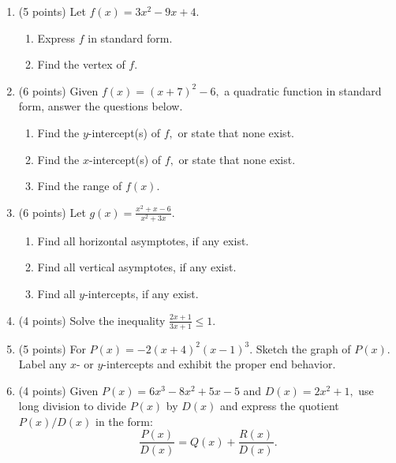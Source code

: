 \documentclass[11pt]{article}
\begin{document}
\begin{enumerate}
\item (5 points) Let $f(x)=3x^2-9x+4.$
\begin{enumerate}
\item Express $f$ in standard form.
\vspace{1.5in}
\item Find the vertex of $f.$
\vspace{0.5in}
\end{enumerate}
\item (6 points) Given $f(x)=(x+7)^2-6,$ a quadratic function in standard form, answer the questions below.
\begin{enumerate}
\item Find the $y$-intercept(s) of $f,$ or state that none exist.
\vfill
\item Find the $x$-intercept(s) of $f,$ or state that none exist.
\vfill
\item Find the range of $f(x).$
\vfill
\end{enumerate}
\newpage

\item (6 points) Let $g(x)=\frac{x^2+x-6}{x^2+3x}.$
\begin{enumerate}
\item Find all horizontal asymptotes, if any exist.
\vfill
\item Find all vertical asymptotes, if any exist.
\vfill
\item Find all $y$-intercepts, if any exist.
\vfill
\end{enumerate}
\item (4 points) Solve the inequality $\frac{2x+1}{3x+1}\leq 1.$
\vspace{3in}
\newpage
\item (5 points) For $P(x)=-2(x+4)^2(x-1)^3.$ Sketch the graph of $P(x).$ Label any $x$- or $y$-intercepts and exhibit the proper end behavior.
\vspace{2in}
\vfill
\item (4 points) Given $P(x)= 6x^3-8x^2+5x-5$ and $D(x) =2x^2+1 ,$ use long division to divide $P(x)$ by $D(x)$ and express the quotient $P(x)/D(x)$ in the form:
$$\frac{P(x)}{D(x)}=Q(x)+\frac{R(x)}{D(x)}.$$

\vfill

\end{enumerate}
\end{document}
